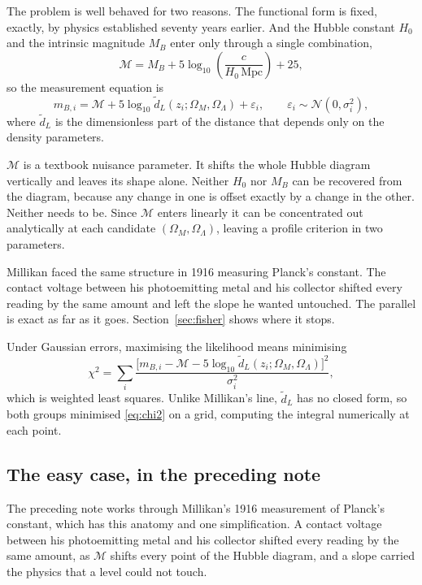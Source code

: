 \documentclass[11pt]{article}
\begin{document}
The problem is well behaved for two reasons.  The functional form is fixed,
exactly, by physics established seventy years earlier.  And the
Hubble constant $H_0$ and the intrinsic magnitude $M_B$ enter only through a
single combination,
\begin{equation}\label{eq:calM}
  \mathcal{M} = M_B + 5\log_{10}\!\left(\frac{c}{H_0\,\text{Mpc}}\right) + 25,
\end{equation}
so the measurement equation is
\begin{equation}\label{eq:meas}
  m_{B,i} = \mathcal{M}
    + 5\log_{10}\tilde d_L(z_i;\Omega_M,\Omega_\Lambda) + \varepsilon_i,
  \qquad \varepsilon_i \sim \mathcal{N}(0,\sigma_i^2),
\end{equation}
where $\tilde d_L$ is the dimensionless part of the distance that depends only
on the density parameters.

$\mathcal{M}$ is a textbook nuisance parameter.  It shifts the whole Hubble
diagram vertically and leaves its shape alone.  Neither $H_0$ nor $M_B$ can be
recovered from the diagram, because any change in one is offset exactly by a
change in the other.  Neither needs to be.  Since $\mathcal{M}$ enters
linearly it can be concentrated out analytically at each candidate
$(\Omega_M, \Omega_\Lambda)$, leaving a profile criterion in two parameters.

Millikan faced the same structure in 1916 measuring Planck's constant.
The contact voltage between his photoemitting metal and his collector shifted
every reading by the same amount and left the slope he wanted untouched.  The
parallel is exact as far as it goes.  Section~\ref{sec:fisher} shows where it
stops.

Under Gaussian errors, maximising the likelihood means minimising
\begin{equation}\label{eq:chi2}
  \chi^2 = \sum_{i}
  \frac{\bigl[m_{B,i} - \mathcal{M}
    - 5\log_{10}\tilde d_L(z_i;\Omega_M,\Omega_\Lambda)\bigr]^2}{\sigma_i^2},
\end{equation}
which is weighted least squares.  Unlike Millikan's line, $\tilde d_L$ has no
closed form, so both groups minimised \eqref{eq:chi2} on a grid, computing the
integral numerically at each point.

\subsection*{The easy case, in the preceding note}

The preceding note works through Millikan's 1916 measurement of Planck's
constant, which has this anatomy and one simplification.  A contact voltage
between his photoemitting metal and his collector shifted every reading by the
same amount, as $\mathcal{M}$ shifts every point of the Hubble diagram, and a
slope carried the physics that a level could not touch.
\end{document}
